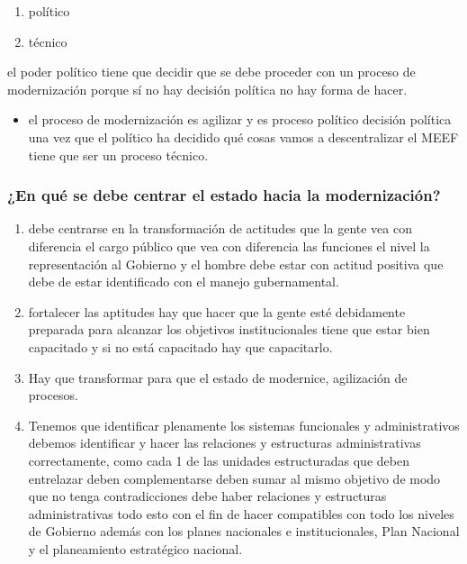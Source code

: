 \documentclass[
  jou,
  floatsintext,
  longtable,
  a4paper,
  nolmodern,
  notxfonts,
  notimes,
  12pt,
  colorlinks=true,linkcolor=blue,citecolor=blue,urlcolor=blue]{apa7}
\providecommand{\tightlist}{%
  \setlength{\itemsep}{0pt}\setlength{\parskip}{0pt}}
\begin{document}
\begin{enumerate}
\def\labelenumi{\arabic{enumi}.}
\tightlist
\item
  político
\item
  técnico
\end{enumerate}

el poder político tiene que decidir que se debe proceder con un proceso
de modernización porque sí no hay decisión política no hay forma de
hacer.

\begin{itemize}
\tightlist
\item
  el proceso de modernización es agilizar y es proceso político decisión
  política una vez que el político ha decidido qué cosas vamos a
  descentralizar el MEEF tiene que ser un proceso técnico.
\end{itemize}

\subsubsection{¿En qué se debe centrar el estado hacia la
modernización?}\label{en-quuxe9-se-debe-centrar-el-estado-hacia-la-modernizaciuxf3n}

\begin{enumerate}
\def\labelenumi{\arabic{enumi}.}
\tightlist
\item
  debe centrarse en la transformación de actitudes que la gente vea con
  diferencia el cargo público que vea con diferencia las funciones el
  nivel la representación al Gobierno y el hombre debe estar con actitud
  positiva que debe de estar identificado con el manejo gubernamental.
\item
  fortalecer las aptitudes hay que hacer que la gente esté debidamente
  preparada para alcanzar los objetivos institucionales tiene que estar
  bien capacitado y si no está capacitado hay que capacitarlo.
\item
  Hay que transformar para que el estado de modernice, agilización de
  procesos.
\item
  Tenemos que identificar plenamente los sistemas funcionales y
  administrativos debemos identificar y hacer las relaciones y
  estructuras administrativas correctamente, como cada 1 de las unidades
  estructuradas que deben entrelazar deben complementarse deben sumar al
  mismo objetivo de modo que no tenga contradicciones debe haber
  relaciones y estructuras administrativas todo esto con el fin de hacer
  compatibles con todo los niveles de Gobierno además con los planes
  nacionales e institucionales, Plan Nacional y el planeamiento
  estratégico nacional.
\end{enumerate}
\end{document}
